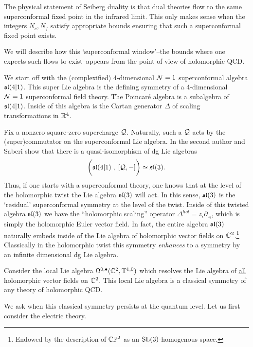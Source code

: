 \documentclass[11pt]{amsart}
\def\SU{{\rm SU}}
\begin{document}
The physical statement of Seiberg duality is that dual theories flow to the same superconformal fixed point in the infrared limit. 
This only makes sense when the integers $N_c,N_f$ satisfy appropriate bounds ensuring that such a superconformal fixed point exists. 

We will describe how this `superconformal window'--the bounds where one expects such flows to exist--appears from the point of view of holomorphic QCD. 

We start off with the (complexified) 4-dimensional $\cN=1$ superconformal algebra $\sl(4|1)$.
This super Lie algebra is the defining symmetry of a 4-dimensional $\cN=1$ superconformal field theory. 
The Poincar\'{e} algebra is a subalgebra of $\sl(4|1)$. %
Inside of this algebra is the Cartan generator $\Delta$ of scaling transformations in $\RR^4$.

Fix a nonzero square-zero supercharge $\cQ$. 
Naturally, such a $\cQ$ acts by the (super)commutator on the superconformal Lie algebra.
In \cite{SWsuco} the second author and Saberi show that there is a quasi-isomorphism of dg Lie algebras
\[
\bigg(\sl(4|1) \; , \; [\cQ, -] \bigg) \simeq \sl(3) .
\]
Thus, if one starts with a superconformal theory, one knows that at the level of the holomorphic twist the Lie algebra $\sl(3)$ will act.  
In this sense, $\sl(3)$ is the `residual' superconformal symmetry at the level of the twist. 
Inside of this twisted algebra $\sl(3)$ we have the ``holomorphic scaling'' operator $\Delta^{hol} = z_i \partial_{z_i}$, which is simply the holomorphic Euler vector field.  
In fact, the entire algebra $\sl(3)$ naturally embeds inside of the Lie algebra of holomorphic vector fields on $\CC^2$.\footnote{Endowed by the description of $\CC \PP^2$ as an ${\rm SL}(3)$-homogenous space.}
Classically in the holomorphic twist this symmetry {\em enhances} to a symmetry by an infinite dimensional dg Lie algebra. 

\begin{thm} \label{thm:swsuco}
Consider the local Lie algebra $\Omega^{0,\bu}(\CC^2, \T^{1,0})$ which resolves the Lie algebra of \ul{all} holomorphic vector fields on $\CC^2$. 
This local Lie algebra is a classical symmetry of any theory of holomorphic QCD. 
\end{thm}

We ask when this classical symmetry persists at the quantum level. 
Let us first consider the electric theory. 
\end{document}
